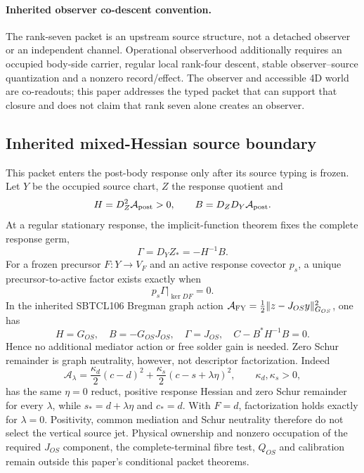 \documentclass[11pt]{article}
\begin{document}
\paragraph{Inherited observer co-descent convention.}
The rank-seven packet is an upstream source structure, not a detached
observer or an independent channel.  Operational observerhood additionally
requires an occupied body-side carrier, regular local rank-four descent,
stable observer--source quantization and a nonzero record/effect.  The
observer and accessible 4D world are co-readouts; this paper addresses the
typed packet that can support that closure and does not claim that rank seven
alone creates an observer.

\subsection*{Inherited mixed-Hessian source boundary}
This packet enters the post-body response only after its source typing is
frozen.  Let $Y$ be the occupied source chart, $Z$ the response quotient and
\begin{equation}
 H=D_Z^2\mathcal A_{\rm post}>0,
 \qquad B=D_ZD_Y\mathcal A_{\rm post}.
\end{equation}
At a regular stationary response, the implicit-function theorem fixes the
complete response germ,
\begin{equation}
 \boxed{\Gamma=D_YZ_*=-H^{-1}B.}
 \label{eq:viib-mixed-hessian-response}
\end{equation}
For a frozen precursor $F:Y\to V_F$ and an active response covector $p_s$,
a unique precursor-to-active factor exists exactly when
\begin{equation}
 \boxed{p_s\Gamma\vert_{\ker DF}=0.}
 \label{eq:viib-active-factorization}
\end{equation}
In the inherited SBTCL106 Bregman graph action
$\mathcal A_{\rm FY}=\frac12\lVert z-J_{OS}y\rVert_{G_{OS}}^2$, one has
\begin{equation}
 H=G_{OS},\quad B=-G_{OS}J_{OS},\quad
 \Gamma=J_{OS},\quad C-B^*H^{-1}B=0.
 \label{eq:viib-sbtcl-specialization}
\end{equation}
Hence no additional mediator action or free solder gain is needed.  Zero
Schur remainder is graph neutrality, however, not descriptor factorization.
Indeed
\begin{equation}
 \mathcal A_\lambda
 =\frac{\kappa_d}{2}(c-d)^2
 +\frac{\kappa_s}{2}(c-s+\lambda\eta)^2,
 \qquad \kappa_d,\kappa_s>0,
 \label{eq:viib-lambda-counterfamily}
\end{equation}
has the same $\eta=0$ reduct, positive response Hessian and zero Schur
remainder for every $\lambda$, while
$s_*=d+\lambda\eta$ and $c_*=d$.  With $F=d$, factorization holds exactly for
$\lambda=0$.  Positivity, common mediation and Schur neutrality therefore do
not select the vertical source jet.  Physical ownership and nonzero
occupation of the required $J_{OS}$ component, the complete-terminal fibre
test, $Q_{OS}$ and calibration remain outside this paper's conditional packet
theorems.
\end{document}
